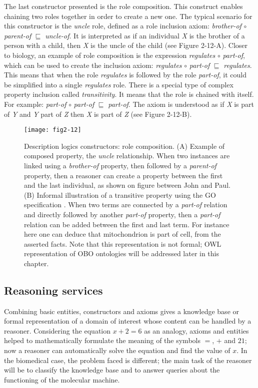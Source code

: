 The last constructor presented is the role composition. This construct enables chaining two roles together in order to create a new one. The typical scenario for this constructor is the \emph{uncle} role, defined as a role inclusion axiom: \emph{brother-of} $ \circ $ \emph{parent-of} $ \sqsubseteq $ \emph{uncle-of}. It is interpreted as if an individual \emph{X} is the brother of a person with a child, then \emph{X} is the uncle of the child (see Figure 2-12-A). Closer to biology, an example of role composition is the expression \emph{regulates} $ \circ $ \emph{part-of}, which can be used to create the inclusion axiom: \emph{regulates} $ \circ $ \emph{part-of} $ \sqsubseteq $ \emph{regulates}. This means that when the role \emph{regulates} is followed by the role \emph{part-of}, it could be simplified into a single \emph{regulates} role. There is a special type of complex property inclusion called \emph{transitivity}. It means that the role is chained with itself. For example: \emph{part-of} $ \circ $ \emph{part-of} $ \sqsubseteq $ \emph{part-of}. The axiom is understood as if \emph{X} is part of \emph{Y} and \emph{Y} part of \emph{Z} then \emph{X} is part of \emph{Z} (see Figure 2-12-B).

\begin{figure}[ht]
    \centering
    \texttt{[image: fig2-12]}
    \caption{Description logics constructors: role composition. (A) Example of composed property, the \emph{uncle} relationship. When two instances are linked using a \emph{brother-of} property, then followed by a \emph{parent-of} property, then a reasoner can create a property between the first and the last individual, as shown on figure between John and Paul. (B) Informal illustration of a transitive property using the GO specification \citep{gorels}. When two terms are connected by a \emph{part-of} relation and directly followed by another \emph{part-of} property, then a \emph{part-of} relation can be added between the first and last term. For instance here one can deduce that mitochondrion is part of cell, from the asserted facts. Note that this representation is not formal; OWL representation of OBO ontologies will be addressed later in this chapter.}
    \label{fig2-12}
\end{figure}

\subsection{Reasoning services}

Combining basic entities, constructors and axioms gives a knowledge base or formal representation of a domain of interest whose content can be handled by a reasoner. Considering the equation $ x + 2 = 6 $ as an analogy, axioms and entities helped to mathematically formulate the meaning of the symbols $ = $, $ + $ and $ 21 $; now a reasoner can automatically solve the equation and find the value of $ x $. In the biomedical case, the problem faced is different; the main task of the reasoner will be to classify the knowledge base and to answer queries about the functioning of the molecular machine.

